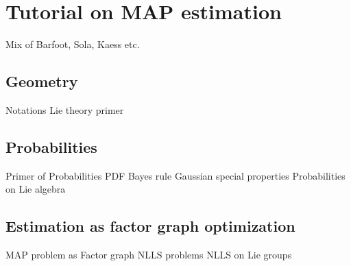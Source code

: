 \chapter{Tutorial on MAP estimation}
\minitoc

Mix of Barfoot, Sola, Kaess etc.

\section{Geometry}
Notations
Lie theory primer

\section{Probabilities}
Primer of Probabilities
    PDF
    Bayes rule
    Gaussian special properties
Probabilities on Lie algebra

\section{Estimation as factor graph optimization}
MAP problem as Factor graph
NLLS problems
NLLS on Lie groups
